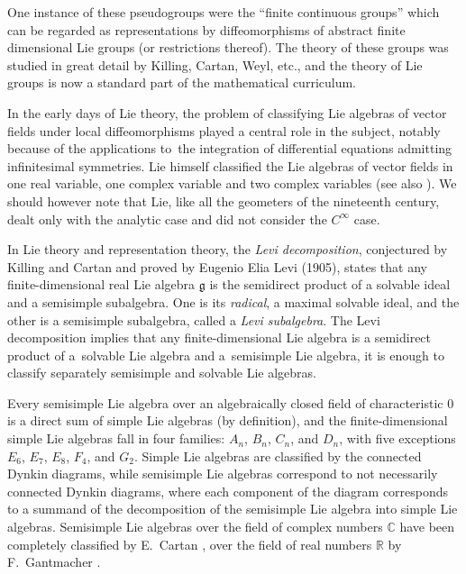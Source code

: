 \documentclass[pdftex]{sigma}
\numberwithin{equation}{section}
\begin{document}
One instance of these pseudogroups were the ``finite continuous groups'' which can be regarded as representations by diffeomorphisms of abstract finite dimensional Lie groups (or restrictions thereof). The theory of these groups was studied in great detail by Killing, Cartan, Weyl, etc., and the theory of Lie groups is now a standard part of the mathematical curriculum.

In the early days of Lie theory, the problem of classifying Lie algebras of vector
fields under local diffeomorphisms played a central role in the subject, notably
because of the applications to~the integration of differential equations admitting
infinitesimal symmetries. Lie himself classified the Lie algebras of vector fields in
one real variable, one complex variable and two complex variables \cite{Lie2,Lie1} (see also \cite{92}).
We should however note that Lie, like all the geometers
of the nineteenth century, dealt only with the analytic case and did not
consider the $C^\infty$ case.

In Lie theory and representation theory, the \emph{Levi decomposition}, conjectured by Killing and Cartan and proved by Eugenio Elia Levi (1905), states that any finite-dimensional real Lie algebra $\mathfrak{g}$ is the semidirect product of a solvable ideal and a semisimple subalgebra. One is its \emph{radical}, a maximal solvable ideal, and the other is a semisimple subalgebra, called a \emph{Levi subalgebra}. The Levi decomposition implies that any finite-dimensional Lie algebra is a semidirect product of a~solvable Lie algebra and a~semisimple Lie algebra, it is enough to classify separately semisimple and solvable Lie algebras.

Every semisimple Lie algebra over an algebraically closed field of characteristic 0 is a direct sum of simple Lie algebras (by definition), and the finite-dimensional simple Lie algebras fall in four families: $A_n$, $B_n$, $C_n$, and $D_n$, with five exceptions $E_6$, $E_7$, $E_8$, $F_4$, and $G_2$. Simple Lie algebras are classified by the connected Dynkin diagrams, while semisimple Lie algebras correspond to not necessarily connected Dynkin diagrams, where each component of the diagram corresponds to a summand of the decomposition of the semisimple Lie algebra into simple Lie algebras. Semisimple Lie algebras over the field of complex numbers ${\mathbb C}$
have been completely classified by E.~Cartan \cite{Cartan1894}, over the field of
real numbers ${\mathbb R}$ by F.~Gantmacher \cite{Gantmacher39}.
\end{document}
